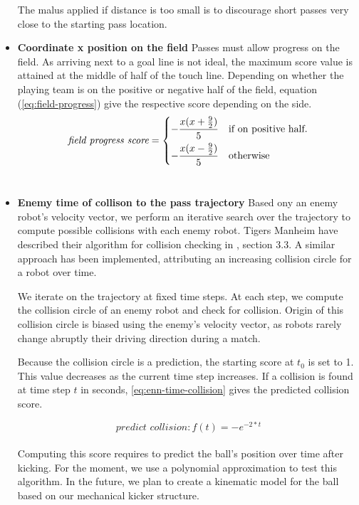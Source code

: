 \begin{itemize}
    The malus applied if distance is too small is to discourage
    short passes very close to the starting pass location. \\
    
    \item \textbf{Coordinate x position on the field}
    Passes must allow progress on the field. As arriving next to a goal line is not ideal, the maximum score value
    is attained at the middle of half of the touch line. Depending on whether the playing team is on the positive
    or negative half of the field, equation (\ref{eq:field-progress}) give the respective score depending on the side.
    \begin{equation}
        \label{eq:field-progress}
        \textit{field progress score} =
        \begin{dcases}
            -\frac{x (x + \frac{9}{2})}{5} & \text{if on positive half}. \\
            -\frac{x (x - \frac{9}{2})}{5} & \text{otherwise}
        \end{dcases}
    \end{equation} \\

    \item \textbf{Enemy time of collison to the pass trajectory}
    Based ony an enemy robot's velocity vector,
    we perform an iterative search over the trajectory to compute possible collisions with each
    enemy robot. Tigers Manheim have described their algorithm for collision checking in \cite{tdp_tigers_2024}, section 3.3.
    A similar approach has been implemented, attributing an increasing collision circle for a robot over time.

    We iterate on the trajectory at fixed time steps. At each step, we compute the collision circle of an enemy robot
    and check for collision. Origin of this collision circle is biased using the enemy's velocity vector, as robots rarely change
    abruptly their driving direction during a match.

    Because the collision circle is a prediction, the starting score at $t_0$ is set to 1. This value
    decreases as the current time step increases. If a collision is found at time step $t$ in seconds,
    \ref{eq:enn-time-collision} gives the predicted collision score.

    \begin{equation}
        \label{eq:enn-time-collision}
        \textit{predict collision}: f(t) = -e^{-2 * t}
    \end{equation} \\

    Computing this score requires to predict the ball's position over time after kicking.
    For the moment, we use a polynomial approximation to test this algorithm. In the future, we plan to create
    a kinematic model for the ball based on our mechanical kicker structure.

\end{itemize}

